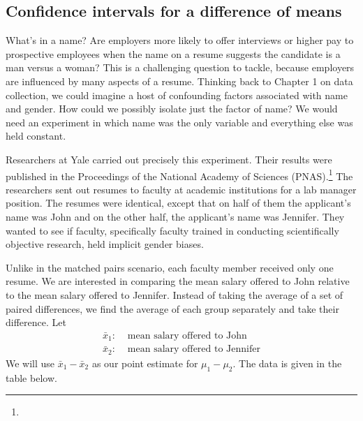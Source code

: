 \D{\newpage}

\subsection{Confidence intervals for a difference of means}

\newcommand{\johnn}{63}
\newcommand{\jennifern}{64}
\newcommand{\johnmean}{30,238}
\newcommand{\jennifermean}{26,508}
\newcommand{\johnsd}{5567}
\newcommand{\jennifersd}{7247}
\newcommand{\johnjenniferSE}{1151}

What's in a name?  Are employers more likely to offer interviews or higher pay to prospective employees when the name on a resume suggests the candidate is a man versus a woman?  This is a challenging question to tackle, because employers are influenced by many aspects of a resume.  Thinking back to Chapter 1 on data collection, we could imagine a host of confounding factors associated with name and gender.  How could we possibly isolate just the factor of name?  We would need an experiment in which name was the only variable and everything else was held constant.

Researchers at Yale carried out precisely this experiment.  Their results were published in the Proceedings of the National Academy of Sciences (PNAS).\footnote{} The researchers sent out resumes to faculty at academic institutions for a lab manager position.  The resumes were identical, except that on half of them the applicant's name was John and on the other half, the applicant's name was Jennifer.  They wanted to see if faculty, specifically faculty trained in conducting scientifically objective research, held implicit gender biases.

Unlike in the matched pairs scenario, each faculty member received only one resume.  We are interested in comparing the mean salary offered to John relative to the mean salary offered to Jennifer.  Instead of taking the average of a set of paired differences, we find the average of each group separately and take their difference.  Let
\begin{align*}
\bar{x}_1:& \text{ mean salary offered to John}\\
\bar{x}_2: &\text{ mean salary offered to Jennifer}
\end{align*}
We will use $\bar{x}_1 - \bar{x}_2$ as our point estimate for $\mu_1-\mu_2$.  The data is given in the table below.

